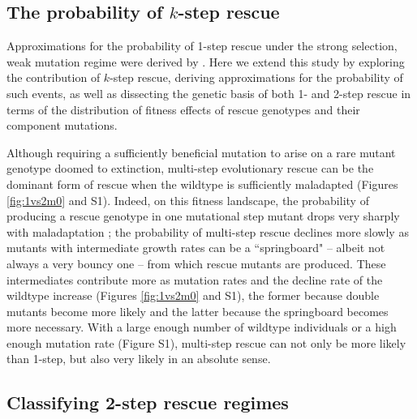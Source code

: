 \documentclass[9pt,twocolumn,twoside,lineno]{gsajnl}
\begin{document}
\subsection{The probability of $k$-step rescue}

Approximations for the probability of 1-step rescue under the strong selection, weak mutation regime were derived by \cite{Anciaux2018}.  
Here we extend this study by exploring the contribution of $k$-step rescue, deriving approximations for the probability of such events, as well as dissecting the genetic basis of both 1- and 2-step rescue in terms of the distribution of fitness effects of rescue genotypes and their component mutations.

Although requiring a sufficiently beneficial mutation to arise on a rare mutant genotype doomed to extinction, multi-step evolutionary rescue can be the dominant form of rescue when the wildtype is sufficiently maladapted (Figures \ref{fig:1vs2m0} and S1). 
Indeed, on this fitness landscape, the probability of producing a rescue genotype in one mutational step mutant drops very sharply with maladaptation \citep{Anciaux2018}; the probability of multi-step rescue declines more slowly as mutants with intermediate growth rates can be a ``springboard" -- albeit not always a very bouncy one -- from which rescue mutants are produced. 
These intermediates contribute more as mutation rates and the decline rate of the wildtype increase (Figures \ref{fig:1vs2m0} and S1), the former because double mutants become more likely and the latter because the springboard becomes more necessary.
With a large enough number of wildtype individuals or a high enough mutation rate (Figure S1), multi-step rescue can not only be more likely than 1-step, but also very likely in an absolute sense.

\subsection{Classifying 2-step rescue regimes}
\end{document}
